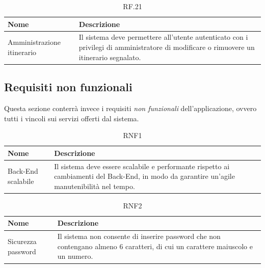 \documentclass{natourDoc}
\begin{document}
\begin{table}[H]
	\centering
	\begin{tabular}{ |p{5cm}|p{10.3cm}| }
		\hline
		\rowcolor{PineGreen!70}
		\textbf{Nome}              & \textbf{Descrizione}                                                                                \\
		\hline
		Amministrazione itinerario & Il sistema deve permettere all'utente autenticato con i privilegi di amministratore di modificare o
		rimuovere un itinerario segnalato.                                                                                               \\
		\hline
	\end{tabular}
	\caption{RF.21}
	\label{table:21}
\end{table}

\subsection{Requisiti non funzionali}
Questa sezione conterrà invece i requisiti \textit{non funzionali} dell'applicazione, ovvero tutti i vincoli sui servizi offerti dal sistema.

\begin{table}[H]
	\centering
	\begin{tabular}{ |p{5cm}|p{10.3cm}| }
		\hline
		\rowcolor{PineGreen!70}
		\textbf{Nome}      & \textbf{Descrizione}                                                                 \\
		\hline
		Back-End scalabile & Il sistema deve essere scalabile e performante rispetto ai cambiamenti del Back-End,
		in modo da garantire un'agile manutenibilità nel tempo.                                                   \\
		\hline
	\end{tabular}
	\caption{RNF1}
	\label{table:21}
\end{table}

\begin{table}[H]
	\centering
	\begin{tabular}{ |p{5cm}|p{10.3cm}| }
		\hline
		\rowcolor{PineGreen!70}
		\textbf{Nome}      & \textbf{Descrizione}                                            \\
		\hline
		Sicurezza password & Il sistema non consente di inserire password che non contengano
		almeno 6 caratteri, di cui un carattere maiuscolo e un numero.                       \\
		\hline
	\end{tabular}
	\caption{RNF2}
	\label{table:22}
\end{table}
\end{document}
